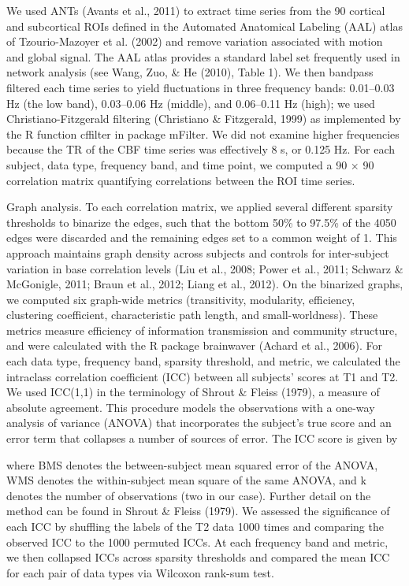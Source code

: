  We used ANTs (Avants et al., 2011) to extract time series from the 90 cortical and subcortical ROIs defined in the Automated Anatomical Labeling (AAL) atlas of Tzourio-Mazoyer et al. (2002) and remove variation associated with motion and global signal.  The AAL atlas provides a standard label set frequently used in network analysis (see Wang, Zuo, \& He (2010), Table 1). We then bandpass filtered each time series to yield fluctuations in three frequency bands: 0.01–0.03 Hz (the low band), 0.03–0.06 Hz (middle), and 0.06–0.11 Hz (high); we used Christiano-Fitzgerald filtering (Christiano \& Fitzgerald, 1999) as implemented by the R function cffilter in  package mFilter. We did not examine higher frequencies because the TR of the CBF time series was effectively 8 s, or 0.125 Hz. For each subject, data type, frequency band, and time point, we computed a 90 × 90 correlation matrix quantifying correlations between the ROI time series. 

Graph analysis. To each correlation matrix, we applied several different sparsity thresholds to binarize the edges, such that the bottom 50\% to 97.5\% of the 4050 edges were discarded and the remaining edges set to a common weight of 1. This approach maintains graph density across subjects and controls for inter-subject variation in base correlation levels (Liu et al., 2008; Power et al., 2011; Schwarz \& McGonigle, 2011; Braun et al., 2012; Liang et al., 2012).  On the binarized graphs, we computed six graph-wide metrics (transitivity, modularity, efficiency, clustering coefficient, characteristic path length, and small-worldness). These metrics measure efficiency of information transmission and community structure, and were calculated with the R package brainwaver (Achard et al., 2006). For each data type, frequency band, sparsity threshold, and metric, we calculated the intraclass correlation coefficient (ICC) between all subjects’ scores at T1 and T2. We used ICC(1,1) in the terminology of Shrout \& Fleiss (1979), a measure of absolute agreement. This procedure models the observations with a one-way analysis of variance (ANOVA) that incorporates the subject’s true score and an error term that collapses a number of sources of error. The ICC score is given by


 
where BMS denotes the between-subject mean squared error of the ANOVA, WMS denotes the within-subject mean square of the same ANOVA, and k denotes the number of observations (two in our case). Further detail on the method can be found in Shrout \& Fleiss (1979). We assessed the significance of each ICC by shuffling the labels of the T2 data 1000 times and comparing the observed ICC to the 1000 permuted ICCs. At each frequency band and metric, we then collapsed ICCs across sparsity thresholds and compared the mean ICC for each pair of data types via Wilcoxon rank-sum test. 

